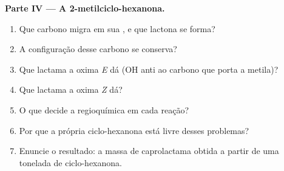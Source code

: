 \begin{problem}
\medskip\noindent\textbf{Parte IV --- A 2-metilciclo-hexanona.}
\begin{enumerate}[resume]
  \item Que carbono migra em sua , e que lactona se forma?
  \item A configuração desse carbono se conserva?
  \item Que lactama a oxima \textit{E} dá (OH anti ao carbono que porta a metila)?
  \item Que lactama a oxima \textit{Z} dá?
  \item O que decide a regioquímica em cada reação?
  \item Por que a própria ciclo-hexanona está livre desses problemas?
  \item Enuncie o resultado: a massa de caprolactama obtida a partir de uma tonelada de ciclo-hexanona.
\end{enumerate}
\end{problem}
